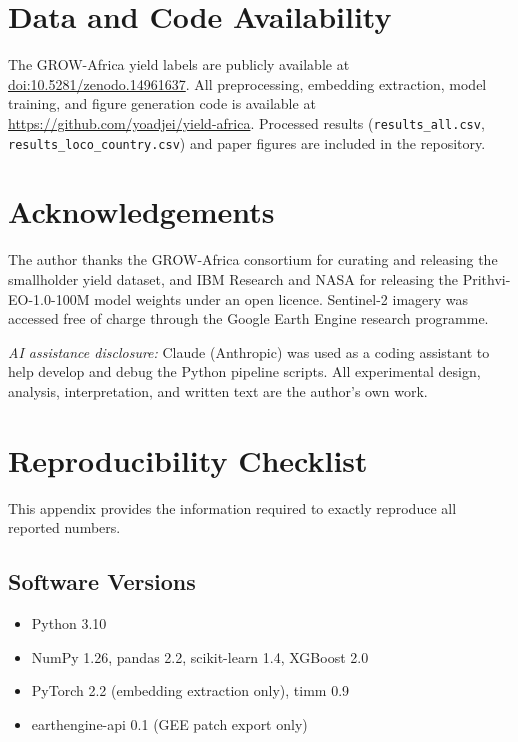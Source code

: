 \documentclass[journal]{IEEEtran}
\begin{document}
\section*{Data and Code Availability}

The GROW-Africa yield labels are publicly available at
\href{https://doi.org/10.5281/zenodo.14961637}{doi:10.5281/zenodo.14961637}.
All preprocessing, embedding extraction, model training, and figure
generation code is available at
\url{https://github.com/yoadjei/yield-africa}.
Processed results (\texttt{results\_all.csv},
\texttt{results\_loco\_country.csv}) and paper figures are included in the
repository.

\section*{Acknowledgements}

The author thanks the GROW-Africa consortium for curating and releasing the
smallholder yield dataset, and IBM Research and NASA for releasing the
Prithvi-EO-1.0-100M model weights under an open licence.
Sentinel-2 imagery was accessed free of charge through the Google Earth Engine
research programme.

\textit{AI assistance disclosure:} Claude (Anthropic) was used as a coding
assistant to help develop and debug the Python pipeline scripts.
All experimental design, analysis, interpretation, and written text are
the author's own work.

\appendix
\section{Reproducibility Checklist}
\label{app:repro}

This appendix provides the information required to exactly reproduce all
reported numbers.

\subsection{Software Versions}

\begin{itemize}
  \item Python 3.10
  \item NumPy 1.26, pandas 2.2, scikit-learn 1.4, XGBoost 2.0
  \item PyTorch 2.2 (embedding extraction only), timm 0.9
  \item earthengine-api 0.1 (GEE patch export only)
\end{itemize}
\end{document}
